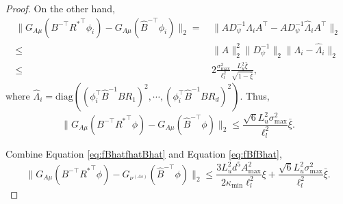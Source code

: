 \begin{proof}
On the other hand, 
\begin{align*}
\|G_{A\mu}(B^{-\top}{R^*}^{\top}\phi_i) - G_{A\mu}(\hat{B}^{-\top}\phi_i)\|_2 
= & \, \|A D_{\psi}^{-1}\Lambda_iA^{\top}- A D_{\psi}^{-1}\hat{\Lambda}_iA^{\top}\|_2 \\
\le & \, \|A\|^2_2 \|D_{\psi}^{-1}\|_2 \|\Lambda_i - \hat{\Lambda}_i\|_2\\
\le & \, 2\frac{\sigma_{\max}^2}{\ell_l^2}\frac{L_u^2\bar{\xi}}{\sqrt{1-\bar{\xi}}},
\end{align*}
where $\hat{\Lambda}_i = \text{diag}\left((\phi_i^{\top}\hat{B}^{-1}BR_1)^2, \cdots, (\phi_i^{\top}\hat{B}^{-1}BR_d)^2\right)$.
Thus,
\begin{equation}
\label{eq:fBfBhat}
\|G_{A\mu}(B^{-\top}{R^*}^{\top}\phi) - G_{A\mu}(\hat{B}^{-\top}\phi)\|_2 \le  \frac{\sqrt{6}L_u^2\sigma_{\max}^2}{\ell_l^2}\bar{\xi}. 
\end{equation}

Combine Equation \eqref{eq:fBhatfhatBhat} and Equation \eqref{eq:fBfBhat},
\[
\|G_{A\mu}(B^{-\top}{R^*}^{\top}\phi) - G_{\nu^{(As)}}(\hat{B}^{-\top}\phi)\|_2
\le 
\frac{3L_u^2d^5A^2_{\max}}{2\kappa_{\min}\ell_l^2}\xi + \frac{\sqrt{6}L_u^2\sigma_{\max}^2}{\ell_l^2}\bar{\xi}.
\]
\end{proof}

